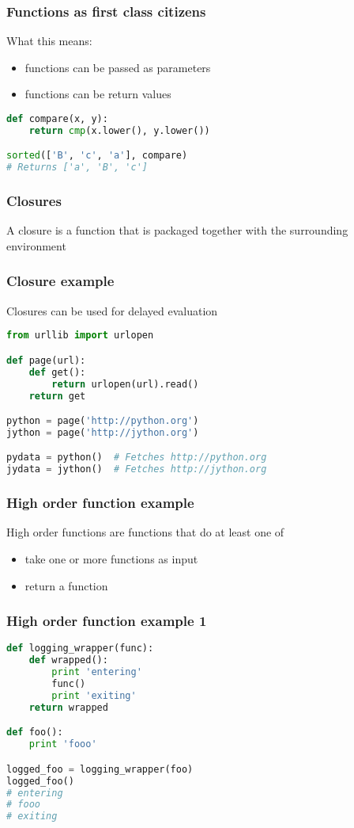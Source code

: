 \documentclass{beamer}
\begin{document}
\begin{frame}[fragile]
\frametitle{Functions as first class citizens}

What this means:
\begin{itemize}
  \item functions can be passed as parameters
  \item functions can be return values
\end{itemize}
\pause
\begin{lstlisting}[language=python]
def compare(x, y):
    return cmp(x.lower(), y.lower())

sorted(['B', 'c', 'a'], compare)
# Returns ['a', 'B', 'c']
\end{lstlisting}

\end{frame}


\begin{frame}[fragile]
\frametitle{Closures}
A closure is a function that is packaged together with the surrounding environment
\end{frame}


\begin{frame}[fragile]
\frametitle{Closure example}
Closures can be used for delayed evaluation
\vspace{5 mm}
\begin{lstlisting}[language=python]
from urllib import urlopen

def page(url):
    def get():
        return urlopen(url).read()
    return get

python = page('http://python.org')
jython = page('http://jython.org')

pydata = python()  # Fetches http://python.org
jydata = jython()  # Fetches http://jython.org
\end{lstlisting}
\end{frame}

\begin{frame}[fragile]
\frametitle{High order function example}
High order functions are functions that do at least one of
\begin{itemize}
  \item take one or more functions as input
  \item return a function
\end{itemize}
\end{frame}

\begin{frame}[fragile]
\frametitle{High order function example 1}
\begin{lstlisting}[language=python]
def logging_wrapper(func):
    def wrapped():
        print 'entering'
        func()
        print 'exiting'
    return wrapped

def foo():
    print 'fooo'

logged_foo = logging_wrapper(foo)
logged_foo()
# entering
# fooo
# exiting
\end{lstlisting}
\end{frame}
\end{document}
